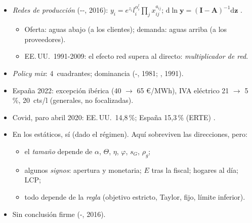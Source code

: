 \documentclass{article}
\begin{document}
\begin{columnas}
\begin{itemize}
\begin{itemize}
  \item Rentas: pacto de rentas, - (1988).
  \end{itemize}
\item \emph{Redes de producción} (--, 2016): $y_i=e^{z_i}l_i^{\alpha^l_i}\prod_j x_{ij}^{a_{ij}}$; $\mathrm{d}\ln\mathbf y=(\mathbf I-\mathbf A)^{-1}\mathrm{d}\mathbf z$ .
  \begin{itemize}
  \item Oferta: aguas abajo (a los clientes); demanda: aguas arriba (a los proveedores).
  \item EE.\,UU.\ 1991-2009: el efecto red supera al directo: \emph{multiplicador de red}.
  \end{itemize}
\end{itemize}
\begin{itemize}
\item \emph{Policy mix}: 4~cuadrantes; dominancia (-, 1981; , 1991).
\item España 2022: excepción ibérica (40 $\to$ 65 €/MWh), IVA eléctrico 21 $\to$ 5\,\%, 20~cts/l (generales, no focalizadas).
\item Covid, paro abril 2020: EE.\,UU.\ 14,8\,\%; España 15,3\,\% (ERTE) .
\end{itemize}
\begin{itemize}
\item En los estáticos, sí (dado el régimen). Aquí sobreviven las direcciones, pero:
  \begin{itemize}
  \item el \emph{tamaño} depende de $\alpha$, $\Theta$, $\eta$, $\varphi$, $s_G$, $\rho_g$;
  \item algunos \emph{signos}: apertura y monetaria; $E$ tras la fiscal; hogares al día; LCP;
  \item todo depende de la \emph{regla} (objetivo estricto, Taylor, fijo, límite inferior).
  \end{itemize}
\item Sin conclusión firme (-, 2016).
\end{itemize}
{\footnotesize\setlength{\tabcolsep}{3pt}\renewcommand{\arraystretch}{1.1}
\begin{tabularx}{\linewidth}{>{\raggedright\arraybackslash}p{0.24\linewidth}>{\raggedright\arraybackslash}p{0.31\linewidth}>{\raggedright\arraybackslash}X}

\end{tabularx}}
\end{columnas}
\end{document}
